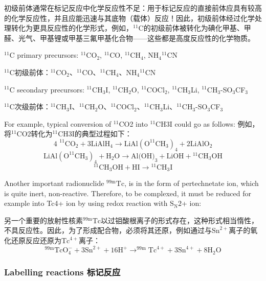 \documentclass[dvipsnames, svgnames,a4paper,11pt]{article}
\begin{document}
初级前体通常在标记反应中化学反应性不足：用于标记反应的直接前体应具有较高的化学反应性，并且应能迅速与其底物（载体）反应！因此，初级前体经过化学处理转化为更具反应性的化学形式，例如，${}^{11}\mathrm{C}$的初级前体被转化为碘化甲基、甲醛、光气、甲基锂或甲基三氟甲基化合物——这些都是高度反应性的化学物质。

${}^{11}\mathrm{C}$ primary precursors: ${}^{11}\mathrm{CO}_2$, ${}^{11}\mathrm{C}$O, ${}^{11}\mathrm{CH}_4$, NH$_4{}^{11}\mathrm{C}$N

${}^{11}\mathrm{C}$初级前体：${}^{11}\mathrm{CO}_2$、${}^{11}\mathrm{C}$O、${}^{11}\mathrm{CH}_4$、NH$_4{}^{11}\mathrm{C}$N

${}^{11}\mathrm{C}$ secondary precursors: ${}^{11}\mathrm{C}$H$_3$I, ${}^{11}\mathrm{C}$H$_2$O, ${}^{11}\mathrm{C}$OCl$_2$, ${}^{11}\mathrm{C}$H$_3$Li, ${}^{11}\mathrm{C}$H$_3$-SO$_3$CF$_3$

${}^{11}\mathrm{C}$次级前体：${}^{11}\mathrm{C}$H$_3$I、${}^{11}\mathrm{C}$H$_2$O、${}^{11}\mathrm{C}$OCl$_2$、${}^{11}\mathrm{C}$H$_3$Li、${}^{11}\mathrm{C}$H$_3$-SO$_3$CF$_3$

For example, typical conversion of ${}^{11}\mathrm{C}$O2 into ${}^{11}\mathrm{C}$H3I could go as follows:
例如，将${}^{11}\mathrm{C}$O2转化为${}^{11}\mathrm{C}$H3I的典型过程如下：
\[
      \text{4 }^{11}\text{CO}_2 + 3\text{LiAlH}_4 \rightarrow \text{LiAl}(\text{O}^{11}\text{CH}_3)_4 + 2\text{LiAlO}_2
\]
\[
      \text{LiAl}(\text{O}^{11}\text{CH}_3)_4 + \text{H}_2\text{O} \rightarrow \text{Al(OH)}_3 + \text{LiOH} + {}^{11}\text{CH}_3\text{OH}
\]
\[
      {}^{11}\text{CH}_3\text{OH} + \text{HI} \rightarrow {}^{11}\text{CH}_3\text{I}
\]

Another important radionuclide ${}^\mathrm{99m}\mathrm{Tc}$, is in the form of pertechnetate ion, which is
quite inert, non-reactive. Therefore, to be complexed, it must be reduced for example
into Tc4+ ion by using redox reaction with $\mathrm{S_N2}$+ ion:

另一个重要的放射性核素${}^\mathrm{99m}\mathrm{Tc}$以过钼酸根离子的形式存在，这种形式相当惰性，不具反应性。因此，为了形成配合物，必须将其还原，例如通过与$\text{Sn}^{2+}$离子的氧化还原反应还原为$\text{Tc}^{4+}$离子：
\[
      ^{99\text{m}}\text{TcO}_4^- + 3\text{Sn}^{2+} + 16\text{H}^+ \rightarrow ^{99\text{m}}\text{Tc}^{4+} + 3\text{Sn}^{4+} + 8\text{H}_2\text{O}
\]

\subsubsection{Labelling reactions 标记反应}
\end{document}
